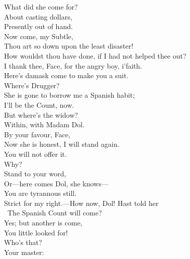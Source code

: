 \documentclass[a4paper,oneside,12pt]{memoir}
\begin{document}
\begin{drama*}
\facespeaks What did she come for?\\
\subtlespeaks {} About casting dollars,\\
Presently out of hand.\\
\facespeaks {} Now come, my Subtle,\\
Thou art so down upon the least disaster!\\
How wouldst thou have done, if I had not helped thee out?\\
\subtlespeaks I thank thee, Face, for the angry boy, i'faith.\\
\facespeaks Here's damask come to make you a suit.\\
\subtlespeaks {} Where's Drugger?\\
\facespeaks She is gone to borrow me a Spanish habit;\\
I'll be the Count, now.\\
\subtlespeaks {} But where's the widow?\\
\facespeaks Within, with Madam Dol.\\
\subtlespeaks {} By your favour, Face,\\
Now she is honest, I will stand again.\\
\facespeaks You will not offer it.\\
\subtlespeaks {} Why?\\
\facespeaks {} Stand to your word,\\
Or---here comes Dol, she knows---\\
\subtlespeaks {} You are tyrannous still.\\
\facespeaks Strict for my right.---How now, Dol! Hast told her\\\
The Spanish Count will come?\\
\dolspeaks {} Yes; but another is come,\\
You little looked for!\\
\facespeaks {} Who's that?\\
\dolspeaks {} Your master:\\

\end{drama*}
\end{document}
